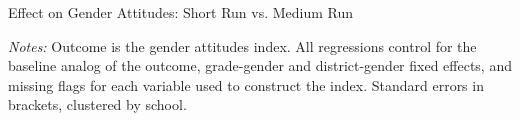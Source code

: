 \documentclass[aspectratio=169,11pt]{beamer}
\begin{document}
\begin{frame}{Effect on Gender Attitudes: Short Run vs. Medium Run}

\centering
\small
\newsavebox{\tablebox}

\usebox{\tablebox}

\vspace{12pt}
\begin{minipage}{\wd\tablebox}
\footnotesize \raggedright
\textit{Notes:} Outcome is the gender attitudes index. All regressions control for the baseline analog of the outcome, grade-gender and district-gender fixed effects, and missing flags for each variable used to construct the index. Standard errors in brackets, clustered by school.
\end{minipage}

\end{frame}
\end{document}

